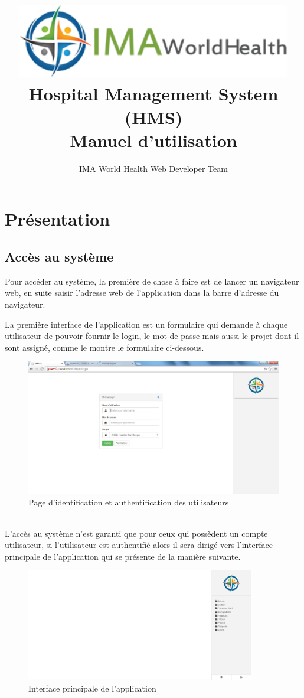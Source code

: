\documentclass[12pt,a4paper]{report}
\author{IMA World Health Web Developer Team}
\title{\includegraphics[width=12cm]{ima.png} \\Hospital Management System\\ (HMS) \\ Manuel d'utilisation}
\begin{document}
\maketitle 
\chapter{Présentation}
\section{Accès au système}
\large{Pour accéder au système, la première de chose à faire est de lancer un navigateur web, en suite saisir l'adresse web de l'application dans la barre d'adresse du navigateur.}

La première interface de l'application est un formulaire qui demande à chaque utilisateur de pouvoir fournir le login, le mot de passe mais  aussi le projet dont il sont assigné, comme le montre le formulaire ci-dessous.
\begin{figure}[h]
\begin{center}
\includegraphics[width=12cm]{pic/login.png}
\end{center}
\caption{Page d'identification et authentification des utilisateurs}
\label{Page d'identification et authentification des utilisateurs}
\end{figure}
\\ L'accès au système n'est garanti que pour ceux qui possèdent un compte utilisateur, si l'utilisateur est authentifié alors il sera dirigé vers l'interface principale de l'application qui se présente de la manière suivante.
\newpage
\begin{figure}[h]
\begin{center}
\includegraphics[width=10cm]{pic/mainInterface.png}
\end{center}
\caption{Interface principale de l'application}
\label{Interface principale de l'application}
\end{figure} 
\end{document}
